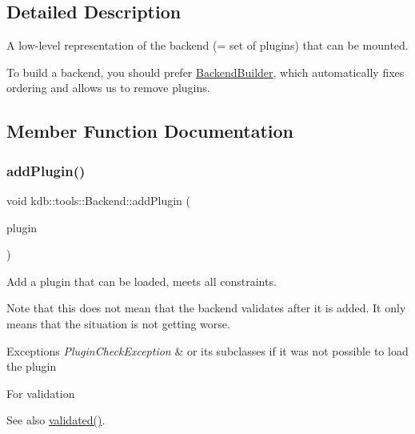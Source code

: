 \subsection{Detailed Description}
A low-\/level representation of the backend (= set of plugins) that can be mounted. 

To build a backend, you should prefer \hyperlink{classkdb_1_1tools_1_1BackendBuilder}{Backend\+Builder}, which automatically fixes ordering and allows us to remove plugins. 

\subsection{Member Function Documentation}
\mbox{\label{classkdb_1_1tools_1_1Backend_a2cce1cc51617baa5431a6036f5cfe05b}} 
\subsubsection{\texorpdfstring{add\+Plugin()}{addPlugin()}}
{\footnotesize\ttfamily void kdb\+::tools\+::\+Backend\+::add\+Plugin (\begin{DoxyParamCaption}\item[{\hyperlink{classkdb_1_1tools_1_1PluginSpec}{Plugin\+Spec} const \&}]{plugin }\end{DoxyParamCaption})\hspace{0.3cm}{\ttfamily [virtual]}}



Add a plugin that can be loaded, meets all constraints. 

\begin{DoxyNote}{Note}
that this does not mean that the backend validates after it is added. It only means that the situation is not getting worse.
\end{DoxyNote}

\begin{DoxyExceptions}{Exceptions}
{\em Plugin\+Check\+Exception} & or its subclasses if it was not possible to load the plugin\\
\hline
\end{DoxyExceptions}
For validation \begin{DoxySeeAlso}{See also}
\hyperlink{classkdb_1_1tools_1_1Backend_a7b28929231bc592c1a83f42121405496}{validated()}. 
\end{DoxySeeAlso}


